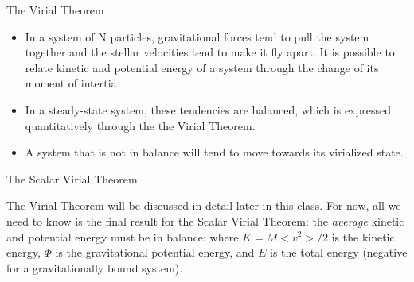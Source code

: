 \documentclass[letterpaper,landscape]{slides}
\begin{document}
\begin{slide}
{\begin{minipage}[t]{13cm}
\begin{center}
\vskip -1in
{\large \color{red}  The Virial Theorem }
\end{center}

\begin{itemize}
\item In a system of N particles, gravitational forces tend to 
pull the system together and the stellar velocities tend to 
make it fly apart. It is possible to relate kinetic and potential
energy of a system through the change of its moment of intertia 
\item In a {\color{blue} steady-state system}, these tendencies
are balanced, which is expressed quantitatively through
the {\color{blue} the Virial Theorem}. 
\item {\color{blue} A system that is not in balance will tend to move
towards its virialized state.} 
\end{itemize}     

\end{minipage}}
\vfill 
\end{slide}




\begin{slide}
\begin{center}
{\large \color{red} 
                    The Scalar Virial Theorem}
\end{center}

The Virial Theorem will be discussed in detail later in this class.  For now, 
all we need to know is the final result for the {\color{blue} Scalar} Virial Theorem:
the {\it average} kinetic and potential energy must be in balance:
where $K = M<v^2>/2$ is the kinetic energy, $\Phi$ is the gravitational potential
energy, and $E$ is the total energy (negative for a gravitationally bound system). 


\vfill
\end{slide}
\end{document}
